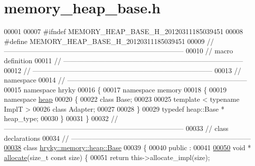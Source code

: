 \hypertarget{memory__heap__base_8h_source}{\section{memory\-\_\-heap\-\_\-base.\-h}
}

\begin{DoxyCode}
00001 
00007 \textcolor{preprocessor}{#ifndef MEMORY\_HEAP\_BASE\_H\_20120311185039451}
00008 \textcolor{preprocessor}{}\textcolor{preprocessor}{#define MEMORY\_HEAP\_BASE\_H\_20120311185039451}
00009 \textcolor{preprocessor}{}\textcolor{comment}{//
      ------------------------------------------------------------------------------}
00010 \textcolor{comment}{// macro definition}
00011 \textcolor{comment}{//
      ------------------------------------------------------------------------------}
00012 \textcolor{comment}{//
      ------------------------------------------------------------------------------}
00013 \textcolor{comment}{// namespace}
00014 \textcolor{comment}{//
      ------------------------------------------------------------------------------}
00015 \textcolor{keyword}{namespace }hryky
00016 \{
00017 \textcolor{keyword}{namespace }memory
00018 \{
00019 \textcolor{keyword}{namespace }\hyperlink{namespacehryky_1_1memory_1_1global_a6fc6103f67c837aa0f39b359588409cd}{heap}
00020 \{
00022     \textcolor{keyword}{class }Base;
00023 
00025     \textcolor{keyword}{template} < \textcolor{keyword}{typename} ImplT >
00026     \textcolor{keyword}{class }Adapter;
00027     
00028 \}
00029     \textcolor{keyword}{typedef} heap::Base * heap\_type;
00030 \}
00031 \}
00032 \textcolor{comment}{//
      ------------------------------------------------------------------------------}
00033 \textcolor{comment}{// class declarations}
00034 \textcolor{comment}{//
      ------------------------------------------------------------------------------}
\hypertarget{memory__heap__base_8h_source_l00038}{}\hyperlink{classhryky_1_1memory_1_1heap_1_1_base}{00038} \textcolor{comment}{}\textcolor{keyword}{class }\hyperlink{classhryky_1_1memory_1_1heap_1_1_base}{hryky::memory::heap::Base}
00039 \{
00040 \textcolor{keyword}{public} :
00041 
\hypertarget{memory__heap__base_8h_source_l00050}{}\hyperlink{classhryky_1_1memory_1_1heap_1_1_base_a068b1ee5b4e759df5e19dff37eecaf92}{00050}     \textcolor{keywordtype}{void} * \hyperlink{classhryky_1_1memory_1_1heap_1_1_base_a068b1ee5b4e759df5e19dff37eecaf92}{allocate}(\textcolor{keywordtype}{size\_t} \textcolor{keyword}{const} size) \{
00051         \textcolor{keywordflow}{return} this->allocate\_impl(size);

\end{DoxyCode}
